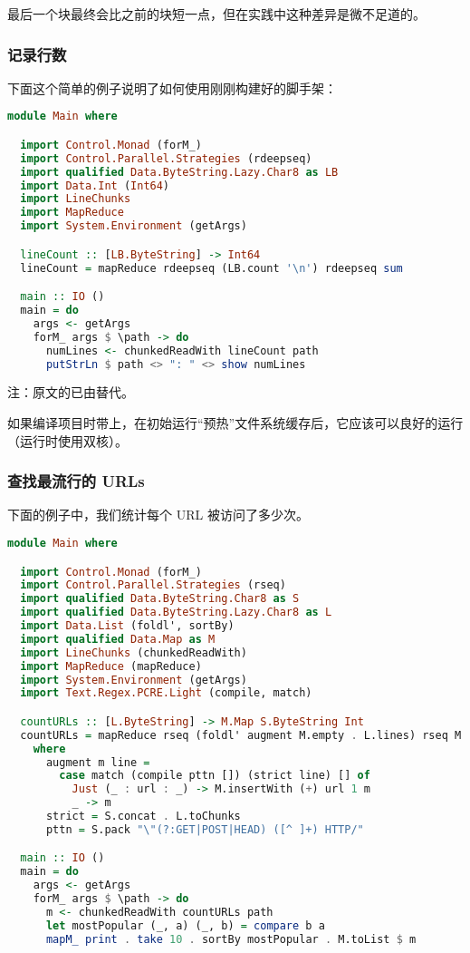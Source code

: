 \documentclass[./main.tex]{subfiles}
\begin{document}
最后一个块最终会比之前的块短一点，但在实践中这种差异是微不足道的。

\subsubsection*{记录行数}

下面这个简单的例子说明了如何使用刚刚构建好的脚手架：

\begin{lstlisting}[language=Haskell]
  module Main where

  import Control.Monad (forM_)
  import Control.Parallel.Strategies (rdeepseq)
  import qualified Data.ByteString.Lazy.Char8 as LB
  import Data.Int (Int64)
  import LineChunks
  import MapReduce
  import System.Environment (getArgs)

  lineCount :: [LB.ByteString] -> Int64
  lineCount = mapReduce rdeepseq (LB.count '\n') rdeepseq sum

  main :: IO ()
  main = do
    args <- getArgs
    forM_ args $ \path -> do
      numLines <- chunkedReadWith lineCount path
      putStrLn $ path <> ": " <> show numLines
\end{lstlisting}

注：原文的已由替代。

如果编译项目时带上，在初始运行“预热”文件系统缓存后，它应该可以良好的运行（运行时使用双核）。

\subsubsection*{查找最流行的 URLs}

下面的例子中，我们统计每个 URL 被访问了多少次。

\begin{lstlisting}[language=Haskell]
  module Main where

  import Control.Monad (forM_)
  import Control.Parallel.Strategies (rseq)
  import qualified Data.ByteString.Char8 as S
  import qualified Data.ByteString.Lazy.Char8 as L
  import Data.List (foldl', sortBy)
  import qualified Data.Map as M
  import LineChunks (chunkedReadWith)
  import MapReduce (mapReduce)
  import System.Environment (getArgs)
  import Text.Regex.PCRE.Light (compile, match)

  countURLs :: [L.ByteString] -> M.Map S.ByteString Int
  countURLs = mapReduce rseq (foldl' augment M.empty . L.lines) rseq M.unions
    where
      augment m line =
        case match (compile pttn []) (strict line) [] of
          Just (_ : url : _) -> M.insertWith (+) url 1 m
          _ -> m
      strict = S.concat . L.toChunks
      pttn = S.pack "\"(?:GET|POST|HEAD) ([^ ]+) HTTP/"

  main :: IO ()
  main = do
    args <- getArgs
    forM_ args $ \path -> do
      m <- chunkedReadWith countURLs path
      let mostPopular (_, a) (_, b) = compare b a
      mapM_ print . take 10 . sortBy mostPopular . M.toList $ m
\end{lstlisting}
\end{document}
